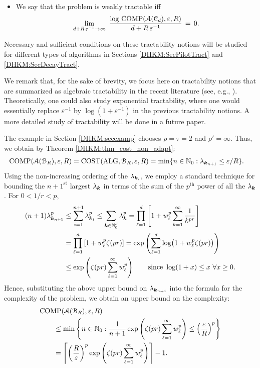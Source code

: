 \documentclass[USenglish]{article}
\theoremstyle{dgthm}
\theoremstyle{dgthm}
\theoremstyle{dgthm}
\theoremstyle{dgthm}
\theoremstyle{dgdef}
\theoremstyle{definition}
\DeclareMathOperator{\ALG}{ALG}
\DeclareMathOperator{\COST}{COST}
\DeclareMathOperator{\COMP}{COMP}
\begin{document}
{\begin{itemize}
   
\item   
We say that the problem is weakly tractable iff    
$$   
\lim_{d+R\,\varepsilon^{-1}\to\infty}\   
\frac{\log\, \COMP(\calA(\calC_d), \varepsilon,R)}   
{d+R\,\varepsilon^{-1}}\,=\,0.   
$$    
\end{itemize}   

Necessary and sufficient conditions on these tractability notions will be studied 
for different types of algorithms in Sections \ref{DHKM:SecPilotTract} and \ref{DHKM:SecDecayTract}. 

We remark that, for the sake of brevity, we focus here on tractability notions that are summarized as 
algebraic tractability in the recent literature 
(see, e.g., \cite{KriWoz19}). Theoretically, one could also study exponential tractability, where 
one would essentially replace $\varepsilon^{-1}$ 
by $\log (1 + \varepsilon^{-1})$ in the previous tractability notions. A more detailed study of 
tractability will be done in a future paper.


The example in Section \ref{DHKM:secexamp} chooses $\rho = \tau = 2$ and $\rho' = \infty$.  Thus, we obtain by Theorem \ref{DHKM:thm_cost_non_adapt}:
\begin{align*}
	\COMP(\calA(\calB_{R}),\varepsilon,R) &= \COST(\ALG,\calB_{R},\varepsilon,R) 
	=\min\{ n \in \N_0 : \lambda_{\bsk_{n+1}} \le \varepsilon/R \}.
\end{align*}
Using the non-increasing ordering of the $\lambda_{{\boldsymbol{k}}_i}$, we employ a standard technique for bounding the $n+1^\text{st}$ largest $\lambda_{{\boldsymbol{k}}}$ in terms of the sum of the $p^\text{th}$ power of all the $\lambda_{{\boldsymbol{k}}}$.  For $0  < 1/r < p$, 
\begin{align*}
(n+1)\lambda_{{\boldsymbol{k}}_{n+1}}^{p} &\leq \sum_{i=1}^{n+1}\lambda_{{\boldsymbol{k}}_{i}}^{p} \leq \sum_{{\boldsymbol{k}} \in {\mathbb{N}}_0^d}\lambda_{{\boldsymbol{k}}}^{p} = \prod_{\ell =1}^d \left[1 + w_\ell^{p}\sum_{k = 1}^\infty \frac {1}{k^{pr}} \right ] \\
& =  \prod_{\ell =1}^d \left[1 + w_\ell^{p}\zeta(pr)\right ] 
= \exp\left(\sum_{\ell = 1}^d \log\bigl(1 + w_\ell^{p}\zeta(pr) \bigr) \right) \\
& \leq \exp\left(\zeta(pr) \sum_{\ell = 1}^{\infty} w_\ell^{p} \right) \qquad \text{since }\log(1+x) \leq x \ \forall x\geq 0.
\end{align*}
Hence, substituting the above upper bound on $\lambda_{{\boldsymbol{k}}_{n+1}}$ into the formula for the complexity of the problem, we obtain an upper bound on the complexity:
\begin{align*}
    \MoveEqLeft{\COMP(\calA(\calB_{R}),\varepsilon,R)} \\
  &\le\min\left\{ n \in \N_0 : \frac{1}{n+1}\exp\left(\zeta(pr) \sum_{\ell = 1}^\infty w_\ell^{p} \right)  \le \left( \frac{\varepsilon}{R} \right)^{p}  \right\} \\
  &= \left \lceil \left( \frac{R}{\varepsilon} \right)^{p}  \exp\left(\zeta(pr) \sum_{\ell = 1}^{\infty} w_\ell^{p} \right) \right \rceil - 1.
\end{align*}

}
\end{document}
